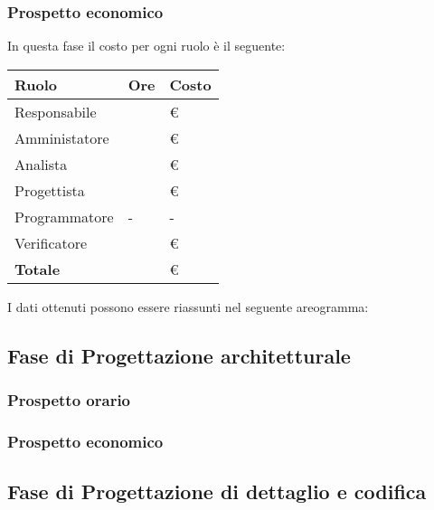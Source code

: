 \subsubsection{Prospetto economico}
In questa fase il costo per ogni ruolo è il seguente:

\begin{center}
	\begin{longtable}{|p{}|p{}|p{}|}
		\hline
		\rowcolor{lighter-grayer}
		\centering\textbf{Ruolo} & \centering\textbf{Ore} & \textbf{Costo} \\
		\hline
		\endfirsthead
		
		\centering Responsabile & \centering & \euro\\
		\hline
		\centering Amministatore & \centering & \euro\\
		\hline
		\centering Analista & \centering & \euro\\
		\hline
		\centering Progettista & \centering & \euro\\
		\hline
		\centering Programmatore & \centering - & - \\
		\hline
		\centering Verificatore & \centering & \euro\\
		\hline
		\centering\textbf{Totale} & \centering & \euro\\
		\hline
	\end{longtable}
\end{center}
I dati ottenuti possono essere riassunti nel seguente areogramma:

\subsection{Fase di Progettazione architetturale}
\subsubsection{Prospetto orario}

\subsubsection{Prospetto economico}

\subsection{Fase di Progettazione di dettaglio e codifica}

